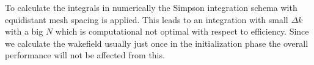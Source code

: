 
To calculate the integrals in  numerically the Simpson integration schema with equidistant mesh spacing is applied. This leads to an integration with small $\Delta k$ with a big $N$ which is computational not optimal with respect to efficiency. Since we calculate the wakefield usually just once in the initialization phase the overall performance will not be affected from this.

